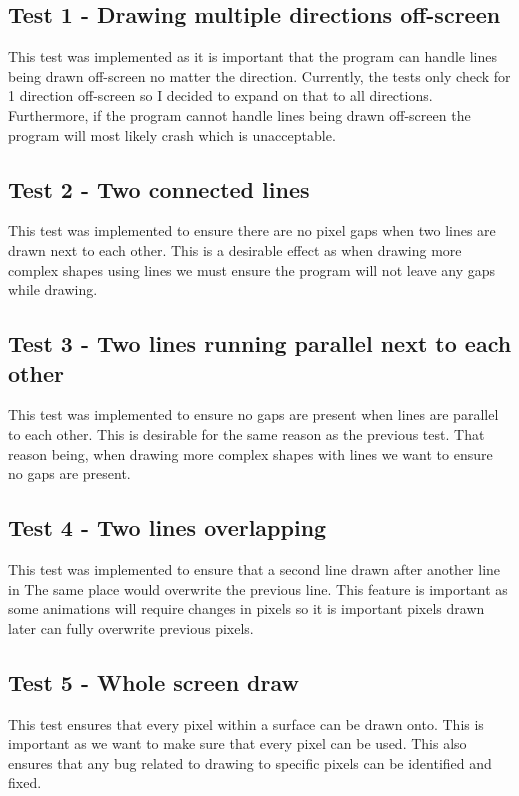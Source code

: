 \documentclass[
	a4paper, %
	10pt, %
]{CSUniSchoolLabReport}
\begin{document}
\subsection*{Test 1 {-} Drawing multiple directions off-screen}
This test was implemented as it is important that the program can handle lines 
being drawn off-screen no matter the direction. Currently, the tests only check for 
1 direction off-screen so I decided to expand on that to all directions. Furthermore, 
if the program cannot handle lines being drawn off-screen the program will most likely
crash which is unacceptable.

\subsection*{Test 2 {-} Two connected lines}
This test was implemented to ensure there are no pixel gaps when two lines 
are drawn next to each other. This is a desirable effect as when drawing more 
complex shapes using lines we must ensure the program will not leave any gaps while
drawing.


\subsection*{Test 3 {-} Two lines running parallel next to each other}
This test was implemented to ensure no gaps are present when lines are parallel to each other.
This is desirable for the same reason as the previous test. That reason being, 
when drawing more complex shapes with lines we want to ensure no gaps are present.
\subsection*{Test 4 {-} Two lines overlapping}
This test was implemented to ensure that a second line drawn after another line in The
same place would overwrite the previous line. This feature is important as some animations
 will require changes in pixels so it is important pixels drawn later can fully overwrite
 previous pixels.
\subsection*{Test 5 {-} Whole screen draw}
This test ensures that every pixel within a surface can be drawn onto. This is important
as we want to make sure that every pixel can be used. This also ensures that any bug 
related to drawing to specific pixels can be identified and fixed.
\end{document}
